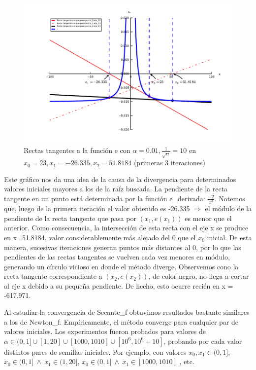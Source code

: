 \begin{figure}[!h]
	\begin{center}
		  \includegraphics[keepaspectratio]{../Imagenes/exp1/divergencia.pdf}
		  \caption{Rectas tangentes a la función e con $\alpha=0.01, \frac{1}{\sqrt{\alpha}} = 10$ en $x_0= 23, x_1= -26.335, x_2=51.8184$ (primeras 3 iteraciones)}
		  \label{fig:contra1}
	\end{center}
\end{figure}
\FloatBarrier

Este gráfico nos da una idea de la causa de la divergencia para determinados valores iniciales mayores a los de la raíz buscada. La pendiente de la recta tangente en un punto está determinada por la función
e\_derivada: $\frac{-2}{x^{3}}$. Notemos que, luego de la primera iteración el valor obtenido es -26.335 $\Rightarrow$ el módulo de la pendiente de la recta tangente que pasa por $(x_1,e(x_1))$ es menor que
el anterior. Como consecuencia, la intersección de esta recta con el eje x se produce en x=51.8184, valor considerablemente más alejado del 0 que el $x_0$ inicial. De esta manera, sucesivas iteraciones 
generan puntos más distantes al 0, por lo que las pendientes de las rectas tangentes se vuelven cada vez menores en módulo, generando un círculo vicioso en donde el método diverge. Observemos cono la recta
tangente correspondiente a $(x_2,e(x_2))$, de color negro, no llega a cortar al eje x debido a su peque\~na pendiente. De hecho, esto ocurre recién en x = -617.971.

Al estudiar la convergencia de Secante\_f obtuvimos resultados bastante similares a los de Newton\_f. Empíricamente, el método converge para cualquier par de valores iniciales. Los experimentos
fueron probados para valores de $\alpha \in (0,1] \cup [1,20] \cup [1000,1010] \cup [10^{6},10^{6}+10]$, probando por cada valor distintos pares de semillas iniciales. Por ejemplo, con valores
$x_0,x_1 \in (0,1]$, $x_0 \in (0,1] \ \wedge \ x_1 \in (1,20]$, $x_0 \in (0,1] \ \wedge \ x_1 \in [1000,1010]$ , etc.

